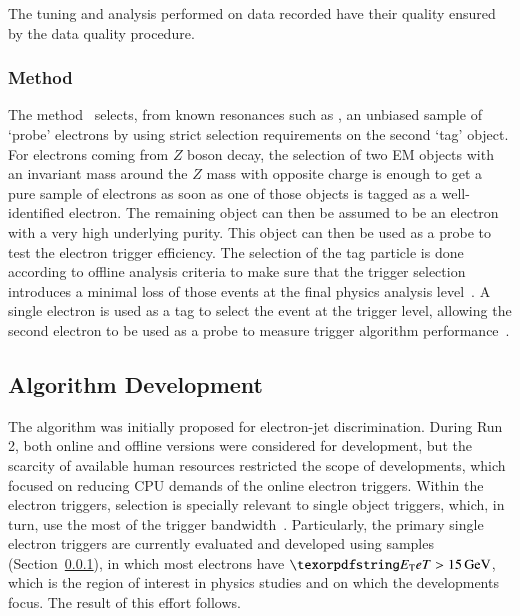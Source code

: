 The tuning and analysis performed on data recorded have their quality ensured by the data quality procedure. 

%


\subsubsection{\TnP Method}\label{ssec:tnp}

The \tnp{} method~\cite{PERF-2016-01} selects, from known resonances such as \Zee{}, an unbiased sample of `probe' electrons by using strict selection requirements on the second `tag' object. For electrons coming from $Z$ boson decay, the selection of two EM objects with an invariant mass around the $Z$ mass with opposite charge is enough to get a pure sample of electrons as soon as one of those objects is tagged as a well-identified electron. The remaining object can then be assumed to be an electron with a very high underlying purity. This object can then be used as a probe to test the electron trigger efficiency. The selection of the tag particle is done according to offline analysis criteria to make sure that the trigger selection introduces a minimal loss of those events at the final physics analysis level~\cite{aaboud2019electron}. A single electron is used as a tag to select the event at the trigger level, allowing the second electron to be used as a probe to measure trigger algorithm performance~\cite{aad2020performance}.


\subsection{Algorithm Development}\label{ssec:rnn_for_online_and_eletrons}

The \rnn{} algorithm was initially proposed for electron-jet discrimination. 
During Run 2, both online and offline versions
were considered for  development, but the scarcity of available human resources restricted the scope of developments, which focused on reducing CPU demands of the online electron triggers. Within the electron triggers, \hlt{} selection is
specially relevant to single object triggers, which, in turn, use the most of the trigger bandwidth~\cite{aad2020performance}. Particularly, the primary single electron triggers
are currently evaluated and developed using \Zee{} \tnp{} samples 
(Section~\ref{ssec:tnp}), in which most electrons have $\et>\SI{15}{\GeV}$, which is the region of interest in physics studies and on which the \rnn{} developments focus. The result of this effort
follows.


